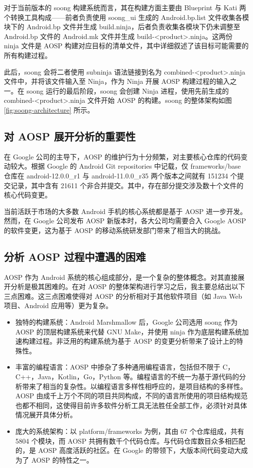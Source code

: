 对于当前版本的 soong 构建系统而言，其在构建方面主要由 Blueprint 与 Kati 两个转换工具构成——前者负责使用 soong\_ui 生成的 Android.bp.list 文件收集各模块下的 Android.bp 文件并生成 build.ninja，后者负责收集各模块下仍未调整至 Android.bp 文件的 Android.mk 文件并生成 build-<product>.ninja。这两份 ninja 文件是 AOSP 构建对应目标的清单文件，其中详细叙述了该目标可能需要的所有构建过程。

此后，soong 会将二者使用 subninja 语法链接到名为 combined-<product>.ninja 文件中，并将该文件输入至 Ninja，作为 Ninja 开展 AOSP 构建过程的输入之一。在 soong 运行的最后阶段，soong 会创建 Ninja 进程，使用先前生成的 combined-<product>.ninja 文件开始 AOSP 的构建。soong 的整体架构如图 \ref{fig:soong-architecture} 所示。

\subsection{对 AOSP 展开分析的重要性}

在 Google 公司的主导下，AOSP 的维护行为十分频繁，对主要核心仓库的代码变动较大。根据 Google 的 Android Git repositories 中记载，仅 frameworks/base 仓库在 android-12.0.0\_r1 与 android-11.0.0\_r35 两个版本之间就有 151234 个提交记录，其中含有 21611 个非合并提交。其中，存在部分提交涉及数十个文件的核心代码变更。

当前活跃于市场的大多数 Android 手机的核心系统都是基于 AOSP 进一步开发。然而，在 Google 公司发布 AOSP 新版本时，各大公司均需要合入 Google AOSP 的软件变更，这为基于 AOSP 的移动系统研发部门带来了相当大的挑战。

\subsection{分析 AOSP 过程中遭遇的困难}

AOSP 作为 Android 系统的核心组成部分，是一个复杂的整体概念。对其直接展开分析是极其困难的。在对 AOSP 的整体架构进行学习之后，我主要总结出以下三点困难。这三点困难使得对 AOSP 的分析相对于其他软件项目（如 Java Web 项目、Android 应用等）更为复杂。

\begin{itemize}
    \item 独特的构建系统：Android Marshmallow 后，Google 公司选用 soong 作为 AOSP 的顶层构建系统来代替 GNU Make，并使用 ninja 作为底层构建系统加速构建过程。非泛用的构建系统为基于 AOSP 的变更分析带来了设计上的特殊性。
    \item 丰富的编程语言：AOSP 中掺杂了多种通用编程语言，包括但不限于 C，C++，Java，Kotlin，Go，Python 等。编程语言的不统一为基于源代码的分析带来了相当的复杂性。以编程语言多样性相呼应的，是项目结构的多样性。AOSP 由成千上万个不同的项目共同构成，不同的语言所使用的项目结构规范也都不相同，这使得目前许多软件分析工具无法胜任全部工作，必须针对具体情况展开具体分析。
    \item 庞大的系统架构：以 platform/frameworks 为例，其由 67 个仓库组成，共有 5804 个模块，而 AOSP 共拥有数千个代码仓库。与代码仓库数目众多相匹配的，是 AOSP 高度活跃的社区。在 Google 的带领下，大版本间代码变动大成为了 AOSP 的特性之一。
\end{itemize}
